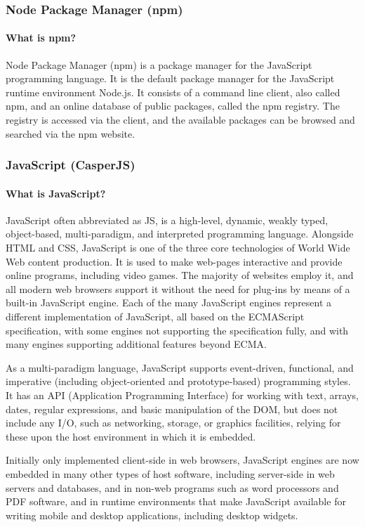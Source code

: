\documentclass{article}
\begin{document}
	\subsubsection{Node Package Manager (npm)}
	\paragraph{What is npm?}
	Node Package Manager (npm) is a package manager for the JavaScript programming language. It is the default package manager for the JavaScript runtime environment Node.js. It consists of a command line client, also called npm, and an online database of public packages, called the npm registry. The registry is accessed via the client, and the available packages can be browsed and searched via the npm website.
	\subsubsection{JavaScript (CasperJS)}
	\paragraph{What is JavaScript?}
	JavaScript often abbreviated as JS, is a high-level, dynamic, weakly typed, object-based, multi-paradigm, and interpreted programming language. Alongside HTML and CSS, JavaScript is one of the three core technologies of World Wide Web content production. It is used to make web-pages interactive and provide online programs, including video games. The majority of websites employ it, and all modern web browsers support it without the need for plug-ins by means of a built-in JavaScript engine. Each of the many JavaScript engines represent a different implementation of JavaScript, all based on the ECMAScript specification, with some engines not supporting the specification fully, and with many engines supporting additional features beyond ECMA.
	
	As a multi-paradigm language, JavaScript supports event-driven, functional, and imperative (including object-oriented and prototype-based) programming styles. It has an API (Application Programming Interface) for working with text, arrays, dates, regular expressions, and basic manipulation of the DOM, but does not include any I/O, such as networking, storage, or graphics facilities, relying for these upon the host environment in which it is embedded.
	
	Initially only implemented client-side in web browsers, JavaScript engines are now embedded in many other types of host software, including server-side in web servers and databases, and in non-web programs such as word processors and PDF software, and in runtime environments that make JavaScript available for writing mobile and desktop applications, including desktop widgets.
	
\end{document}
